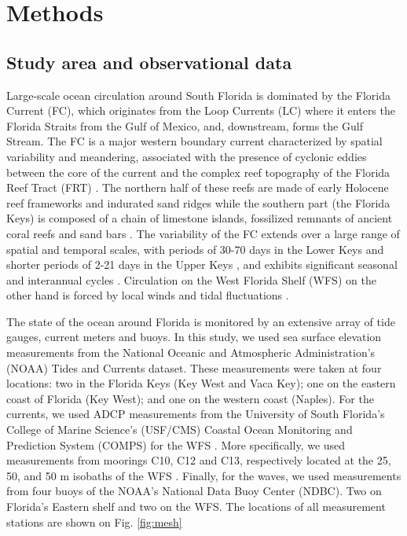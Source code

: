 \documentclass[11pt,a4paper]{article}
\begin{document}
\section{Methods}
\subsection{Study area and observational data}
Large-scale ocean circulation around South Florida is dominated by the Florida Current (FC), which originates from the Loop Currents (LC) where it enters the Florida Straits from the Gulf of Mexico, and, downstream, forms the Gulf Stream. The FC is a major western boundary current characterized by spatial variability and meandering, associated with the presence of cyclonic eddies between the core of the current and the complex reef topography of the Florida Reef Tract (FRT) \citep{lee1995florida,kourafalou2012florida}. The northern half of these reefs are made of early Holocene reef frameworks and indurated sand ridges while the southern part (the Florida Keys) is composed of a chain of limestone islands, fossilized remnants of ancient coral reefs and sand bars \citep{hoffmeister1968geology,shinn1988geology,lidz1991paleoshorelines}. The variability of the FC extends over a large range of spatial and temporal scales, with periods of 30-70 days in the Lower Keys \citep{lee1995florida} and shorter periods of 2-21 days in the Upper Keys \citep{lee1977low}, and exhibits significant seasonal and interannual cycles \citep{johns1987meandering, lee1988wind,schott1988variability}. Circulation on the West Florida Shelf (WFS) on the other hand is forced by local winds and tidal fluctuations \citep{lee2002volume,liu2012seasonal}.

The state of the ocean around Florida is monitored by an extensive array of tide gauges, current meters and buoys. In this study, we used sea surface elevation measurements from the National Oceanic and Atmospheric Administration’s (NOAA) Tides and Currents dataset. These measurements were taken at four locations: two in the Florida Keys (Key West and Vaca Key); one on the eastern coast of Florida (Key West); and one on the western coast (Naples). For the currents, we used ADCP measurements from the University of South Florida's College of Marine Science's (USF/CMS) Coastal Ocean Monitoring and Prediction System (COMPS) for the WFS \citep{weisberg2009mean}. More specifically, we used measurements from moorings C10, C12 and C13, respectively located at the 25, 50, and 50 m isobaths of the WFS \citep{liu2020impacts}. Finally, for the waves, we used measurements from four buoys of the NOAA's National Data Buoy Center (NDBC). Two on Florida's Eastern shelf and two on the WFS. The locations of all measurement stations are shown on Fig. \ref{fig:mesh}
\end{document}
